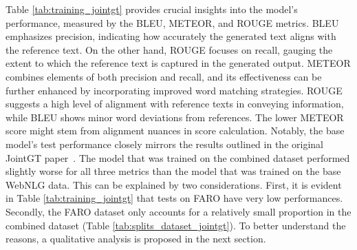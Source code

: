 \documentclass[
]{ceurart}
\begin{document}
Table \ref{tab:training_jointgt} provides crucial insights into the model's performance, measured by the BLEU, METEOR, and ROUGE metrics. BLEU emphasizes precision, indicating how accurately the generated text aligns with the reference text. On the other hand, ROUGE focuses on recall, gauging the extent to which the reference text is captured in the generated output. METEOR combines elements of both precision and recall, and its effectiveness can be further enhanced by incorporating improved word matching strategies. ROUGE suggests a high level of alignment with reference texts in conveying information, while BLEU shows minor word deviations from references. The lower METEOR score might stem from alignment nuances in score calculation. Notably, the base model's test performance closely mirrors the results outlined in the original JointGT paper~\cite{JointGT}.
The model that was trained on the combined dataset performed slightly worse for all three metrics than the model that was trained on the base WebNLG data. This can be explained by two considerations. First, it is evident in Table \ref{tab:training_jointgt} that tests on FARO have very low performances. Secondly, the FARO dataset only accounts for a relatively small proportion in the combined dataset (Table \ref{tab:splits_dataset_jointgt}). To better understand the reasons, a qualitative analysis is proposed in the next section.
\end{document}
